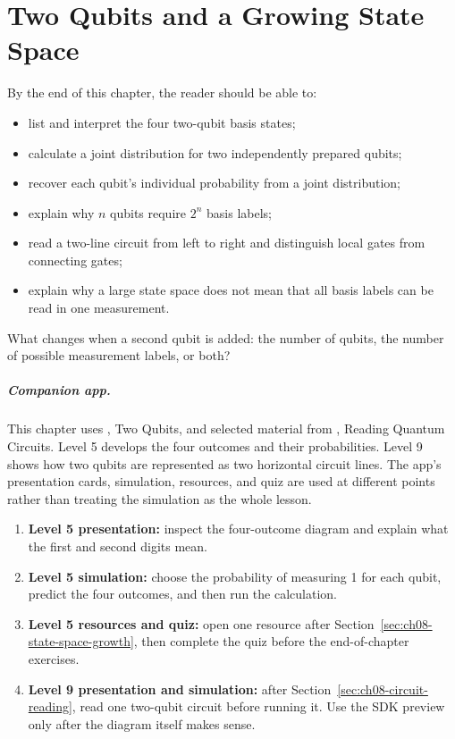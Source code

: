 \chapter[Two Qubits]{Two Qubits and a Growing State Space}
\label{chap:two-qubits-and-a-growing-state-space}

\begin{learningobjectives}
By the end of this chapter, the reader should be able to:
\begin{itemize}
  \item list and interpret the four two-qubit basis states;
  \item calculate a joint distribution for two independently prepared qubits;
  \item recover each qubit's individual probability from a joint distribution;
  \item explain why $n$ qubits require $2^n$ basis labels;
  \item read a two-line circuit from left to right and distinguish local gates from connecting gates;
  \item explain why a large state space does not mean that all basis labels can be read in one measurement.
\end{itemize}
\end{learningobjectives}

\begin{openingquestion}
What changes when a second qubit is added: the number of qubits, the number of possible measurement labels, or both?
\end{openingquestion}

\paragraph{Companion app.}
This chapter uses , Two Qubits, and selected material from , Reading Quantum Circuits. Level 5 develops the four outcomes and their probabilities. Level 9 shows how two qubits are represented as two horizontal circuit lines. The app's presentation cards, simulation, resources, and quiz are used at different points rather than treating the simulation as the whole lesson.

\begin{appactivity}
\begin{enumerate}
  \item \textbf{Level 5 presentation:} inspect the four-outcome diagram and explain what the first and second digits mean.
  \item \textbf{Level 5 simulation:} choose the probability of measuring 1 for each qubit, predict the four outcomes, and then run the calculation.
  \item \textbf{Level 5 resources and quiz:} open one resource after Section~\ref{sec:ch08-state-space-growth}, then complete the quiz before the end-of-chapter exercises.
  \item \textbf{Level 9 presentation and simulation:} after Section~\ref{sec:ch08-circuit-reading}, read one two-qubit circuit before running it. Use the SDK preview only after the diagram itself makes sense.
\end{enumerate}
\end{appactivity}

